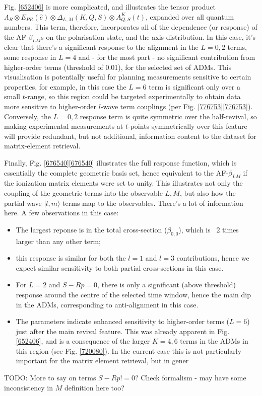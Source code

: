 Fig. \ref{652406} is more complicated, and illustrates the tensor product $\Lambda_{R}\otimes E_{PR}(\hat{e})\otimes \Delta_{L,M}(K,Q,S)\otimes A^{K}_{Q,S}(t)$, expanded over all quantum numbers.
This term, therefore, incorporates all of the dependence (or response) of the AF-$\beta_{LM}$s on the polarisation state, and the axis distribution. In this case, it's clear that there's a significant response to the alignment in the $L=0,2$ terms, some response in $L=4$ and - for the most part - no significant contribution from higher-order terms (threshold of 0.01), for the selected set of ADMs. This visualisation is potentially useful for planning measurements sensitive to certain properties, for example, in this case the $L=6$ term is significant only over a small $t$-range, so this region could be targeted experimentally to obtain data more sensitive to higher-order $l$-wave term couplings (per Fig. \ref{776753}\ref{776753}). Conversely, the $L=0,2$ response term is quite symmetric over the half-revival, so making experimental measurements at $t$-points symmetrically over this feature will provide redundant, but not additional, information content to the dataset for matrix-element retrieval.

Finally, Fig. \ref{676540}\ref{676540} illustrates the full response function, which is essentially the complete geometric basis set,
hence equivalent to the AF-$\beta_{LM}$ if the ionization matrix elements were set to unity. This illustrates not only the coupling of the geometric terms into the observable $L,M$, but also how the partial wave $|l,m\rangle$ terms map to the observables. There's a lot of information here. A few observations in this case:

\begin{itemize}
\item The largest reponse is in the total cross-section ($\beta_{0,0}$), which is ~2 times larger than any other term; 
\item this response is similar for both the $l=1$ and $l=3$ contributions, hence we expect similar sensitivity to both partial cross-sections in this case.
\item For $L=2$ and $S-Rp = 0$, there is only a significant (above threshold) response around the centre of the selected time window, hence the main dip in the ADMs, corresponding to anti-alignment in this case.
\item The parameters indicate enhanced sensitivity to higher-order terms ($L=6$) just after the main revival feature. This was already apparent in Fig. \ref{652406}, and is a consequence of the larger $K=4,6$ terms in the ADMs in this region (see Fig. \ref{720080}). In the current case this is not particularly important for the matrix element retrieval, but in gener

\end{itemize}

TODO: More to say on terms $S-Rp != 0$? Check formalism - may have some inconsistency in $M$ definition here too?
